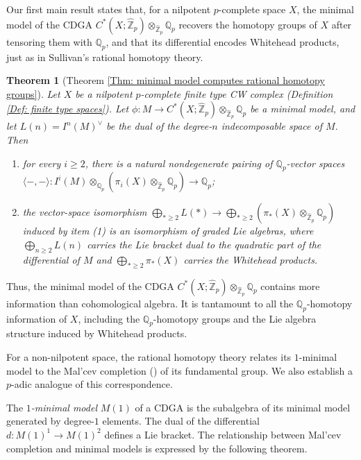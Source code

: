 \documentclass[11pt]{amsart}
\newtheorem{theorem}{Theorem}[section]
\theoremstyle{definition}
\numberwithin{equation}{section}
\numberwithin{equation}{section}
\newcommand\QQ{\mathbb{Q}}
\newcommand\ZZ{\mathbb{Z}}
\begin{document}
Our first main result states that, for a nilpotent $p$-complete space $X$, the minimal model of the CDGA $C^*(X;\widehat{\ZZ}_p)\otimes_{\widehat{\ZZ}_p}\QQ_p$ recovers the homotopy groups of $X$ after tensoring them with $\mathbb Q_p$, and that its differential encodes Whitehead products, just as in Sullivan's rational homotopy theory.

\begin{theorem}[Theorem \ref{Thm: minimal model computes rational homotopy groups}]\label{Intro: Q_p minimal model and homotopy groups}
Let $X$ be a nilpotent $p$-complete finite type CW complex (Definition \ref{Def: finite type spaces}). Let $\phi:M\rightarrow C^*(X;\widehat{\ZZ}_p)\otimes_{\widehat{\ZZ}_p} \QQ_p$ be a minimal model, and let $L(n)=I^n(M)^{\vee}$ be the dual of the degree-$n$ indecomposable space of $M$. Then
\begin{enumerate}[leftmargin=0.25in]
    \item for every $i\geq 2$, there is a natural nondegenerate pairing  of $\QQ_p$-vector spaces  $\langle -,- \rangle: I^i(M)\otimes_{\QQ_p} (\pi_i(X)\otimes_{\widehat{\ZZ}_p} \QQ_p) \rightarrow \QQ_p$;
    \item the vector-space isomorphism $\bigoplus_{*\geq 2} L(*)\rightarrow \bigoplus_{*\geq 2}(\pi_{*}(X)\otimes_{\widehat{\ZZ}_p} \QQ_p)$ induced by item (1) is an isomorphism of graded Lie algebras, where $\bigoplus_{n\geq 2}L(n)$ carries the Lie bracket dual to the quadratic part of the differential of $M$ and $\bigoplus_{*\geq 2}\pi_{*}(X)$ carries the Whitehead products.
\end{enumerate}
\end{theorem}

Thus, the minimal model of the CDGA $C^*(X;\widehat{\ZZ}_p)\otimes_{\widehat{\ZZ}_p}\QQ_p$ contains more information than cohomological algebra. It is tantamount to all the $\QQ_p$-homotopy information of $X$, including the $\QQ_p$-homotopy groups and the Lie algebra structure induced by Whitehead products.

For a non-nilpotent space, the rational homotopy theory relates its $1$-minimal model to the Mal'cev completion (\cite{Malcev-nilpotent-torsion-free-groups}\cite{Quillen-rational-homotopy}\cite{Betts-thesis}\cite{Clement-Majewicz-Zyman-theory-nilpotent-groups}) of its fundamental group. We also establish a $p$-adic analogue of this correspondence. 

The \textit{$1$-minimal model} $M(1)$ of a CDGA is the subalgebra of its minimal model generated by degree-$1$ elements. The dual of the differential $d:M(1)^1\rightarrow M(1)^2$ defines a Lie bracket. The relationship between Mal'cev completion and minimal models is expressed by the following theorem.
\end{document}
